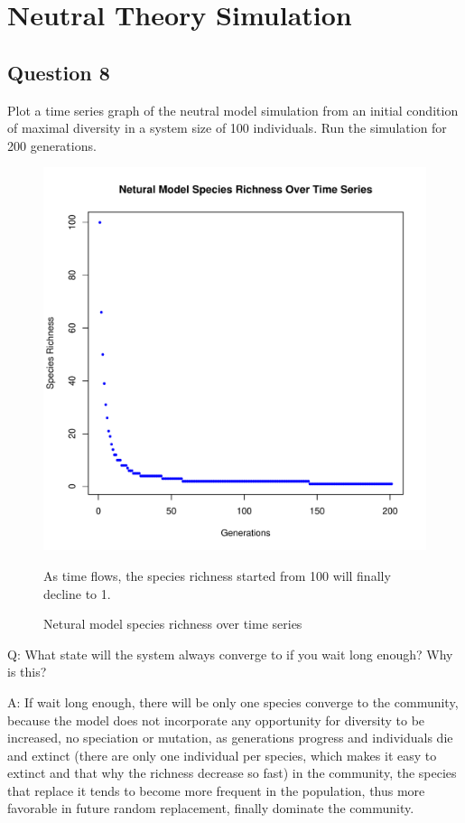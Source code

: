 \documentclass[12pt]{article}
\begin{document}


\newpage

\pagestyle{fancy} 
\renewcommand{\headrulewidth}{0.4pt}
\renewcommand{\footrulewidth}{0.0pt}

\section{Neutral Theory Simulation}
\subsection{Question 8}
Plot a time series graph of the neutral model simulation from an initial condition of maximal diversity in a system size of 100 individuals. Run the simulation for 200 generations. 

\begin{figure}[!ht]
\centering 
\includegraphics[width = 0.6\hsize]{../../results/Question8.pdf} 
\caption{Netural model species richness over time series}
As time flows, the species richness started from 100 will finally decline to 1.
\end{figure}

Q: What state will the system always converge to if you wait long enough?  Why is this?

A: If wait long enough, there will be only one species converge to the community, because the model does not incorporate any opportunity for
diversity to be increased, no speciation or mutation, as generations progress and individuals die and extinct (there are only one individual per species, which makes it easy to extinct and that why the richness decrease so fast) in the community, the species that replace it tends to become more frequent in the population, thus more favorable in future random replacement, finally dominate the community.
\end{document}
